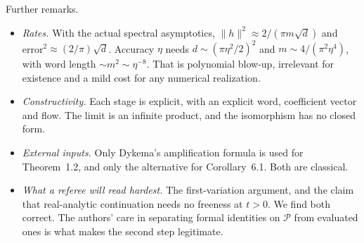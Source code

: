 Further remarks.
\begin{itemize}[leftmargin=*]
\item \emph{Rates.} With the actual spectral asymptotics, $\|h\|^2\approx2/(\pi m\sqrt d)$ and error$^2\approx(2/\pi)\sqrt d$. Accuracy $\eta$ needs $d\sim(\pi\eta^2/2)^2$ and
$m\sim4/(\pi^2\eta^4)$, with word length $\sim m^2\sim\eta^{-8}$. That is polynomial blow-up, irrelevant for existence and a mild cost for any numerical
realization.
\item \emph{Constructivity.} Each stage is explicit, with an explicit word, coefficient vector and flow. The limit is an infinite product, and the
isomorphism has no closed form.
\item \emph{External inputs.} Only Dykema's amplification formula is used for Theorem~1.2, and only the alternative for Corollary~6.1. Both are classical.
\item \emph{What a referee will read hardest.} The first-variation argument, and the claim that real-analytic continuation needs no freeness
at $t>0$. We find both correct. The authors' care in separating formal identities on $\mathcal P$ from evaluated ones is what makes the second step
legitimate.
\end{itemize}
